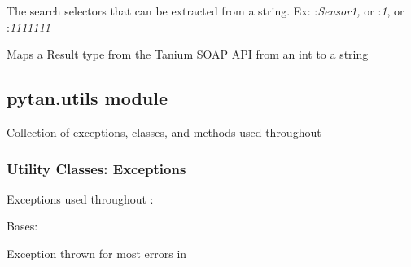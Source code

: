 \documentclass[letterpaper,10pt,english]{sphinxmanual}
\begin{document}

\begin{fulllineitems}
\label{pytan.constants:pytan.constants.SELECTORS}
The search selectors that can be extracted from a string. Ex: :\emph{Sensor1,} or :\emph{1}, or :\emph{1111111}

\end{fulllineitems}


\begin{fulllineitems}
\label{pytan.constants:pytan.constants.SENSOR_TYPE_MAP}
Maps a Result type from the Tanium SOAP API from an int to a string

\end{fulllineitems}



\subsection{pytan.utils module}
\label{pytan.utils::doc}\label{pytan.utils:pytan-utils-module}\label{pytan.utils:module-pytan.utils}
Collection of exceptions, classes, and methods used throughout {\hyperref[pytan:module-pytan]{}}


\subsubsection{Utility Classes: Exceptions}
\label{pytan.utils:utility-classes-exceptions}
Exceptions used throughout {\hyperref[pytan:module-pytan]{}}:

\begin{fulllineitems}
\label{pytan.utils:pytan.utils.HandlerError}
Bases: \href{http://docs.python.org/2.7/library/exceptions.html\#exceptions.Exception}{}

Exception thrown for most errors in {\hyperref[pytan.handler:module-pytan.handler]{}}

\end{fulllineitems}
\end{document}
